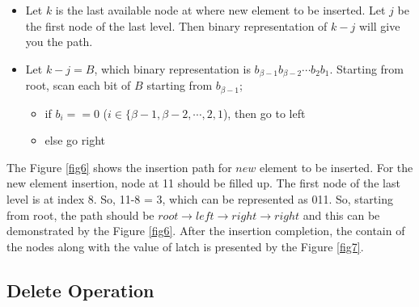 \documentclass[10pt, conference, compsocconf]{IEEEtran}
\begin{document}
\begin{itemize}
\item Let $k$ is the last available node at where new element to be inserted. Let $j$ be the first node of the last level. Then binary representation of $k-j$ will give you the path.
\item Let $k-j = B$, which binary representation is $b_{\beta-1}b_{\beta-2} \cdots b_2b_1$. Starting from root, scan each bit of $B$ starting from $b_{\beta-1}$;
    \begin{itemize}
    \item if $b_i == 0$ ($i \in \{\beta-1,\beta-2, \cdots, 2,1$), then go to left
    \item else go right
    \end{itemize}
\end{itemize}

The Figure \ref{fig6} shows the insertion path for $new$ element to be inserted. For the new element insertion, node at 11 should be filled up. The first node of the last level is at index 8. So, 11-8 = 3, which can be represented as 011. So, starting from root, the path should be $root \rightarrow left \rightarrow right \rightarrow right$ and this can be demonstrated by the Figure \ref{fig6}. After the insertion completion, the contain of the nodes along with the value of latch is presented by the Figure \ref{fig7}.


\subsection{Delete Operation}
\end{document}
